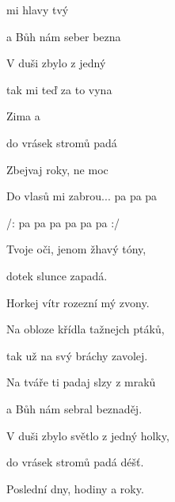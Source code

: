 

\zs
{} mi  hlavy tvý 

a Bůh nám seber bezna

V duši zbylo  z jedný 

tak mi teď za to vyna

Zima a  

do vrásek stromů padá 

Zbejvaj roky,  ne moc 

\ks
\zr

Do vlasů mi zabrou... pa pa pa 

/: pa pa pa  pa pa pa  :/
\kr

\zs
Tvoje oči, jenom žhavý tóny,

dotek slunce zapadá.

Horkej vítr rozezní mý zvony.

\ks
\zr \kr

\zs
Na obloze křídla tažnejch ptáků,

tak už na svý bráchy zavolej.

Na tváře ti padaj slzy z mraků

a Bůh nám sebral beznaděj.

V duši zbylo světlo z jedný holky,

do vrásek stromů padá déšť.

Poslední dny, hodiny a roky.

\ks

\zr
\kr

\kp





